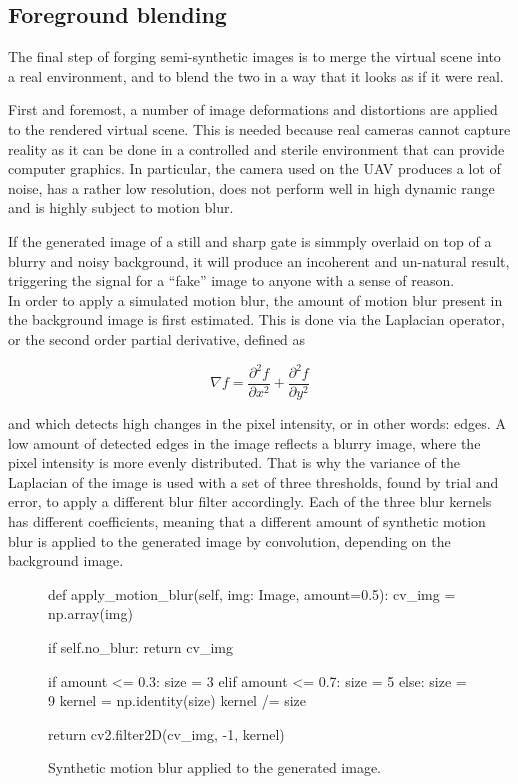 \subsection{Foreground blending}

The final step of forging semi-synthetic images is to merge the virtual scene
into a real environment, and to blend the two in a way that it looks as if it
were real.

First and foremost, a number of image deformations and distortions are applied
to the rendered virtual scene. This is needed because real cameras cannot
capture reality as it can be done in a controlled and sterile environment that
can provide computer graphics. In particular, the camera used on the UAV
produces a lot of noise, has a rather low resolution, does not perform well in
high dynamic range and is highly subject to motion blur.

If the generated image of a still and sharp gate is simmply overlaid on top of
a blurry and noisy background, it will produce an incoherent and un-natural
result, triggering the signal for a ``fake'' image to anyone with a sense of
reason.\\

In order to apply a simulated motion blur, the amount of motion blur present in
the background image is first estimated. This is done via the Laplacian
operator, or the second order partial derivative, defined as

\begin{equation} \label{equ:laplacianoperator}
    \nabla f = \frac{\partial^2 f}{\partial x^2}
        + \frac{\partial^2 f}{\partial y^2}
\end{equation}

and which detects high changes in the pixel intensity, or in other words:
edges. A low amount of detected edges in the image reflects a blurry image,
where the pixel intensity is more evenly distributed. That is why the variance
of the Laplacian of the image is used with a set of three thresholds, found by
trial and error, to apply a different blur filter accordingly. Each of the
three blur kernels has different coefficients, meaning that a different amount
of synthetic motion blur is applied to the generated image by convolution,
depending on the background image.\\
\begin{figure}[h]
    \centering
    \caption{Synthetic motion blur applied to the generated image.}
    \begin{python}
        def apply_motion_blur(self, img: Image, amount=0.5):
            cv_img = np.array(img)

            if self.no_blur:
                return cv_img

            if amount <= 0.3:
                size = 3
            elif amount <= 0.7:
                size = 5
            else:
                size = 9
            kernel = np.identity(size)
            kernel /= size

            return cv2.filter2D(cv_img, -1, kernel)
    \end{python}
\end{figure}

